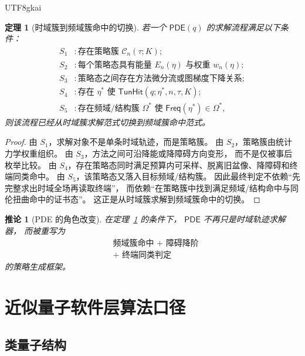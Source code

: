 \documentclass[12pt]{article}
\newtheorem{theorem}{定理}[section]
\newtheorem{corollary}{推论}[section]
\newcommand{\PDE}{\mathsf{PDE}}
\newcommand{\TunHit}{\mathsf{TunHit}}
\newcommand{\Freq}{\mathsf{Freq}}
\begin{document}
\begin{CJK*}{UTF8}{gkai}
\begin{theorem}[时域簇到频域簇命中的切换]
\label{thm:tex53-time-to-frequency}
若一个 \(\PDE(q)\) 的求解流程满足以下条件：
\[
\begin{aligned}
  S_1 &: \text{存在策略簇 }\mathcal C_n(\tau;K);\\
  S_2 &: \text{每个策略态具有能量 }E_n(\eta)\text{ 与权重 }w_n(\eta);\\
  S_3 &: \text{策略态之间存在方法微分流或图梯度下降关系};\\
  S_4 &: \text{存在 }\eta^\ast\text{ 使 }\TunHit(q;\eta^\ast,n,\tau,K);\\
  S_5 &: \text{存在频域/结构簇 }\Omega^\ast\text{ 使 }\Freq(\eta^\ast)\in\Omega^\ast,
\end{aligned}
\]
则该流程已经从时域簇求解范式切换到频域簇命中范式。
\end{theorem}

\begin{proof}
由 \(S_1\)，求解对象不是单条时域轨迹，而是策略簇。
由 \(S_2\)，策略簇由统计力学权重组织。
由 \(S_3\)，方法之间可沿降能或降障碍方向变形，
而不是仅被事后枚举比较。
由 \(S_4\)，存在策略态同时满足预算内可采样、脱离旧盆像、降障碍和终端同类命中。
由 \(S_5\)，该策略态又落入目标频域/结构簇。
因此最终判定不依赖“先完整求出时域全场再读取终端”，
而依赖“在策略簇中找到满足频域/结构命中与同伦扭曲命中的证书态”。
这正是从时域簇求解到频域簇命中的切换。
\end{proof}

\begin{corollary}[PDE 的角色改变]
在定理~\ref{thm:tex53-time-to-frequency} 的条件下，
\(\PDE\) 不再只是时域轨迹求解器，
而被重写为
\[
  \boxed{
    \begin{aligned}
      &\text{频域簇命中 + 障碍降阶}\\
      &\text{+ 终端同类判定}
    \end{aligned}
  }
\]
的策略生成框架。
\end{corollary}

\section{近似量子软件层算法口径}
\label{sec:tex53-quantum-like}

\subsection{类量子结构}
\label{subsec:tex53-quantum-like-objects}


\end{CJK*}
\end{document}
